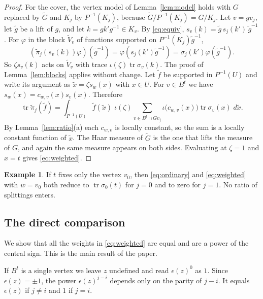 \documentclass[12pt,letterpaper]{article}
\numberwithin{equation}{section}
\theoremstyle{definition}
\newtheorem{example}[theorem]{Example}
\theoremstyle{remark}
\newcommand{\Gt}{\widetilde G}
\newcommand{\tr}{\operatorname{tr}}
\newcommand{\sgn}{\epsilon}
\begin{document}
\begin{proof}
For the cover, the vertex model of Lemma~\ref{lem:model} holds with $G$ replaced by $\Gt$ and $K_j$ by $P^{-1}(K_j)$, because $\Gt/P^{-1}(K_j)=G/K_j$. Let $v=gv_j$, let $\widetilde g$ be a lift of $g$, and let $k=gk'g^{-1}\in K_v$. By \eqref{eq:equiv}, $s_v(k)=\widetilde g\,s_j(k')\,\widetilde g^{-1}$. For $\varphi$ in the block $\widetilde V_v$ of functions supported on $P^{-1}(K_j)\widetilde g^{-1}$,
\[
 (\widetilde\pi_j(s_v(k))\varphi)(\widetilde g^{-1})=\varphi(s_j(k')\widetilde g^{-1})=\sigma_j(k')\varphi(\widetilde g^{-1}).
\]
So $\zeta s_v(k)$ acts on $\widetilde V_v$ with trace $\iota(\zeta)\tr\sigma_v(k)$. The proof of Lemma~\ref{lem:blocks} applies without change. Let $\widetilde f$ be supported in $P^{-1}(U)$ and write its argument as $\widetilde x=\zeta s_w(x)$ with $x\in U$. For $v\in B^t$ we have $s_w(x)=c_{w,v}(x)s_v(x)$. Therefore
\[
 \tr\widetilde\pi_j(\widetilde f)=\int_{P^{-1}(U)}\widetilde f(\widetilde x)\;\iota(\zeta)\!\!\sum_{v\in B^t\cap Gv_j}\iota\bigl(c_{w,v}(x)\bigr)\tr\sigma_v(x)\;d\widetilde x .
\]
By Lemma~\ref{lem:ratio}(a) each $c_{w,v}$ is locally constant, so the sum is a locally constant function of $\widetilde x$. The Haar measure of $\Gt$ is the one that lifts the measure of $G$, and again the same measure appears on both sides. Evaluating at $\zeta=1$ and $x=t$ gives \eqref{eq:weighted}.
\end{proof}

\begin{example}
If $t$ fixes only the vertex $v_0$, then \eqref{eq:ordinary} and \eqref{eq:weighted} with $w=v_0$ both reduce to $\tr\sigma_0(t)$ for $j=0$ and to zero for $j=1$. No ratio of splittings enters.
\end{example}

\subsection*{The direct comparison}
We show that all the weights in \eqref{eq:weighted} are equal and are a power of the central sign. This is the main result of the paper.

If $B^t$ is a single vertex we leave $z$ undefined and read $\sgn(z)^0$ as $1$. Since $\sgn(z)=\pm1$, the power $\sgn(z)^{j-i}$ depends only on the parity of $j-i$. It equals $\sgn(z)$ if $j\ne i$ and $1$ if $j=i$.
\end{document}
